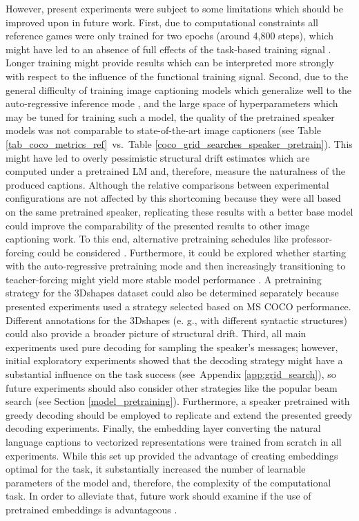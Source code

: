However, present experiments were subject to some limitations which should be improved upon in future work. First, due to computational constraints all reference games were only trained for two epochs (around 4,800 steps), which might have led to an absence of full effects of the task-based training signal \parencite[compared to, e.g.,][who had 300,000 training steps]{lee2019countering}. Longer training might provide results which can be interpreted more strongly with respect to the influence of the functional training signal. Second, due to the general difficulty of training image captioning models which generalize well to the auto-regressive inference mode \parencite{lamb2016professor}, and the large space of hyperparameters which may be tuned for training such a model, the quality of the pretrained speaker models was not comparable to state-of-the-art image captioners (see Table \ref{tab_coco_metrics_ref}~vs.~Table \ref{coco_grid_searches_speaker_pretrain}). This might have led to overly pessimistic structural drift estimates which are computed under a pretrained LM and, therefore, measure the naturalness of the produced captions. Although the relative comparisons between experimental configurations are not affected by this shortcoming because they were all based on the same pretrained speaker, replicating these results with a better base model could improve the comparability of the presented results to other image captioning work. To this end, alternative pretraining schedules like professor-forcing could be considered \parencite{lamb2016professor}. Furthermore, it could be explored whether starting with the auto-regressive pretraining mode and then increasingly transitioning to teacher-forcing might yield more stable model performance \parencite[although similar explorations by][suggest that this order might not work very well]{lowe2020interaction}. A pretraining strategy for the 3Dshapes dataset could also be determined separately because presented experiments used a strategy selected based on MS COCO performance. Different annotations for the 3Dshapes (e. g., with different syntactic structures) could also provide a broader picture of structural drift.
Third, all main experiments used pure decoding for sampling the speaker's messages; however, initial exploratory experiments showed that the decoding strategy might have a substantial influence on the task success (see~Appendix \ref{app:grid_search}), so future experiments should also consider other strategies like the popular beam search (see Section \ref{model_pretraining}). Furthermore, a speaker pretrained with greedy decoding should be employed to replicate and extend the presented greedy decoding experiments.
Finally, the embedding layer converting the natural language captions to vectorized representations were trained from scratch in all experiments. While this set up provided the advantage of creating embeddings optimal for the task, it substantially increased the number of learnable parameters of the model and, therefore, the complexity of the computational task. In order to alleviate that, future work should examine if the use of pretrained embeddings is advantageous \parencite[following, e.~g.,][]{atliha2021pretrained}.

